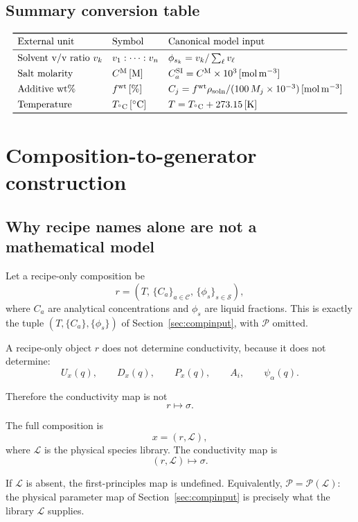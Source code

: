 \documentclass[11pt]{article}
\begin{document}
\subsection{Summary conversion table}

\[
\begin{array}{lll}
\toprule
\text{External unit} & \text{Symbol} & \text{Canonical model input} \\
\midrule
\text{Solvent v/v ratio } v_k & v_1:\cdots:v_{n} &
\phi_{s_k}=v_k/\sum_\ell v_\ell \\[4pt]
\text{Salt molarity} & C^{\rm M}\,[\mathrm{M}] &
C_a^{\rm SI}=C^{\rm M}\times 10^3\,[\mathrm{mol\,m^{-3}}] \\[4pt]
\text{Additive wt\%} & f^{\rm wt}\,[\%] &
C_j = f^{\rm wt}\rho_{\rm soln}/(100\,M_j\times 10^{-3})\,[\mathrm{mol\,m^{-3}}] \\[4pt]
\text{Temperature} & T_{{}^\circ\mathrm C}\,[{}^\circ\mathrm C] &
T=T_{{}^\circ\mathrm C}+273.15\,[\mathrm K] \\
\bottomrule
\end{array}
\]

\section{Composition-to-generator construction}
\label{sec:c2g}

\subsection{Why recipe names alone are not a mathematical model}

Let a recipe-only composition be
\[
r=
\left(
T,\,
\{C_a\}_{a\in\mathcal C},\,
\{\phi_s\}_{s\in\mathcal S}
\right),
\]
where \(C_a\) are analytical concentrations and \(\phi_s\) are liquid fractions.
This is exactly the tuple \((T,\{C_a\},\{\phi_s\})\) of Section~\ref{sec:compinput},
with \(\mathcal P\) omitted.

A recipe-only object \(r\) does not determine conductivity, because it does
not determine:
\[
U_x(q),\qquad D_x(q),\qquad P_x(q),\qquad A_i,\qquad \psi_\alpha(q).
\]

Therefore the conductivity map is not
\[
r\mapsto \sigma.
\]

The full composition is
\[
x=(r,\mathcal L),
\]
where \(\mathcal L\) is the physical species library. The conductivity map is
\[
(r,\mathcal L)\mapsto \sigma.
\]

If \(\mathcal L\) is absent, the first-principles map is undefined. Equivalently,
\(\mathcal P=\mathcal P(\mathcal L)\): the physical parameter map of
Section~\ref{sec:compinput} is precisely what the library \(\mathcal L\)
supplies.
\end{document}
